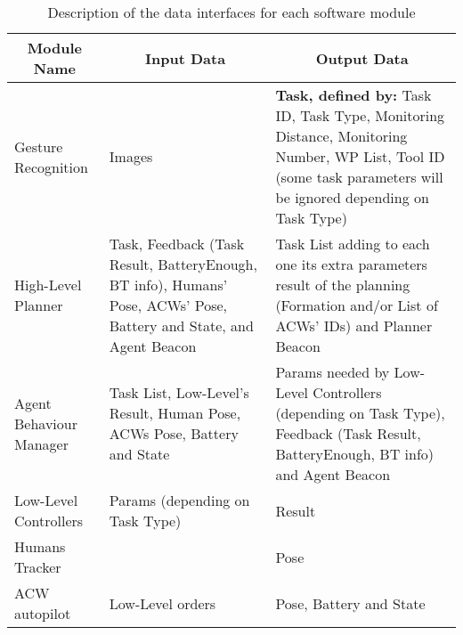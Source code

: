 \begin{table}[ht]
    \centering
    \caption{Description of the data interfaces for each software module}
    \label{tab:interfaces}
    \small
    \begin{tabular}{|p{}|p{}|p{}|}
      \hline
      \multicolumn{1}{|c}{\textbf{Module Name}} & \multicolumn{1}{|c|}{\textbf{Input Data}} & \multicolumn{1}{c|}{\textbf{Output Data}}\\ \hline \hline
      Gesture Recognition & Images & \textbf{Task, defined by:} Task ID, Task Type, Monitoring Distance, Monitoring Number, WP List, Tool ID (some task parameters will be ignored depending on Task Type) \\ \hline
      
      High-Level Planner & Task, Feedback (Task Result, BatteryEnough, \gls{BT} info), Humans' Pose, \glspl{ACW}' Pose, Battery and State, and Agent Beacon & Task List adding to each one its extra parameters result of the planning (Formation and/or List of \glspl{ACW}' IDs) and Planner Beacon \\\hline
      
      Agent Behaviour Manager & Task List, Low-Level's Result, Human Pose, \glspl{ACW} Pose, Battery and State & Params needed by Low-Level Controllers (depending on Task Type), Feedback (Task Result, BatteryEnough, \gls{BT} info) and Agent Beacon \\ \hline
      
      Low-Level Controllers & Params (depending on Task Type) & Result \\ \hline
      
      Humans Tracker &  & Pose \\ \hline
      
      \gls{ACW} autopilot & Low-Level orders & Pose, Battery and State \\ \hline
      
    \end{tabular}
\end{table}

